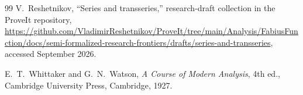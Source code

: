 \documentclass[11pt,a4paper,oneside]{article}
\theoremstyle{definition}
\theoremstyle{remark}
\begin{document}
\begin{thebibliography}{99}
V.~Reshetnikov,
``Series and transseries,'' research-draft collection in the ProveIt
repository,
\url{https://github.com/VladimirReshetnikov/ProveIt/tree/main/Analysis/FabiusFunction/docs/semi-formalized-research-frontiers/drafts/series-and-transseries},
accessed September 2026.

E.~T.~Whittaker and G.~N.~Watson,
\emph{A Course of Modern Analysis}, 4th ed., Cambridge University Press,
Cambridge, 1927.

\end{thebibliography}
\end{document}
